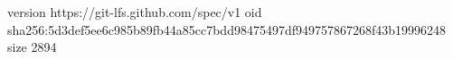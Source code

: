 version https://git-lfs.github.com/spec/v1
oid sha256:5d3def5ee6c985b89fb44a85cc7bdd98475497df949757867268f43b19996248
size 2894
